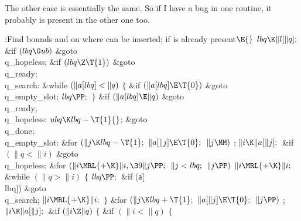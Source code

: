 The other case is essentially the same. So if I have a bug in
one routine, it probably is present in the other one too.

\Y\B\4:Find bounds  and  on where  can be
inserted;  if  is already present\X${}\E{}$\6
$\\{lbq}\K\|l[\|q];{}$\6
\&{if} ${}(\\{lbq}\G\\{ub}){}$\1\5
\&{goto} \\{q\_hopeless};\2\6
\&{if} ${}(\\{lbq}\Z\T{1}){}$\1\5
\&{goto} \\{q\_ready};\2\6
\4\\{q\_search}:\5
\&{while} ${}(\|a[\\{lbq}]<\|q){}$\5
${}\{{}$\1\6
\&{if} ${}(\|a[\\{lbq}]\E\T{0}){}$\1\5
\&{goto} \\{q\_empty\_slot};\2\6
${}\\{lbq}\PP;{}$\6
\4${}\}{}$\2\6
\&{if} ${}(\|a[\\{lbq}]\E\|q){}$\1\5
\&{goto} \\{q\_ready};\2\6
\4\\{q\_hopeless}:\5
${}\\{ubq}\K\\{lbq}-\T{1}{}$;\5
\&{goto} \\{q\_done};\6
\4\\{q\_empty\_slot}:\5
\&{for} ${}(\|j\K\\{lbq}-\T{1};{}$ ${}\|a[\|j]\E\T{0};{}$ ${}\|j\MM){}$\1\5
;\2\6
${}\|i\K\|a[\|j];{}$\6
\&{if} ${}(\|q<\|i){}$\1\5
\&{goto} \\{q\_hopeless};\2\6
\&{for} ${}(\|i\MRL{+{\K}}\|i,\39\|j\PP;{}$ ${}\|j<\\{lbq};{}$ ${}\|j\PP){}$\1\5
${}\|i\MRL{+{\K}}\|i;{}$\2\6
\&{while} ${}(\|q>\|i){}$\5
${}\{{}$\1\6
${}\\{lbq}\PP;{}$\6
\&{if} (\|a[\\{lbq}])\1\5
\&{goto} \\{q\_search};\2\6
${}\|i\MRL{+{\K}}\|i;{}$\6
\4${}\}{}$\2\6
\&{for} ${}(\|j\K\\{lbq}+\T{1};{}$ ${}\|a[\|j]\E\T{0};{}$ ${}\|j\PP){}$\1\5
;\2\6
${}\|i\K\|a[\|j];{}$\6
\&{if} ${}(\|i\Z\|q){}$\5
${}\{{}$\1\6
\&{if} ${}(\|i<\|q){}$\5
${}\{{}$\1\6
